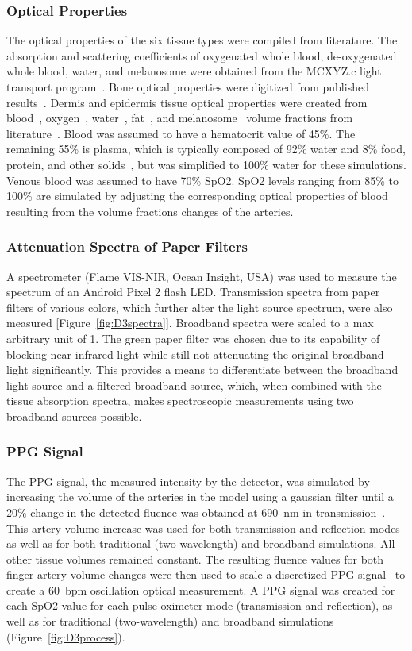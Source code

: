 \subsubsection{Optical Properties}
The optical properties of the six tissue types were compiled from literature. The absorption and scattering coefficients of oxygenated whole blood, de-oxygenated whole blood, water, and melanosome were obtained from the MCXYZ.c light transport program~\cite{JacquesMCXYZ}. Bone optical properties were digitized from published results~\cite{KonugoluVenkataSekar2016}. Dermis and epidermis tissue optical properties were created from blood~\cite{Prahl2012}, oxygen~\cite{Jacques2013}, water~\cite{Hale1973}, fat~\cite{VanVeen2004}, and melanosome~\cite{Jacques1991} volume fractions from literature~\cite{Jacques2013}. Blood was assumed to have a hematocrit value of 45\%. The remaining 55\% is plasma, which is typically composed of 92\% water and 8\% food, protein, and other solids~\cite{Jacques2013}, but was simplified to 100\% water for these simulations. Venous blood was assumed to have 70\% SpO2. SpO2 levels ranging from 85\% to 100\% are simulated by adjusting the corresponding optical properties of blood resulting from the volume fractions changes of the arteries. 
        
\subsubsection{Attenuation Spectra of Paper Filters}
A spectrometer (Flame VIS-NIR, Ocean Insight, USA) was used to measure the spectrum of an Android Pixel 2 flash LED. Transmission spectra from paper filters of various colors, which further alter the light source spectrum, were also measured [Figure~\ref{fig:D3spectra}]. Broadband spectra were scaled to a max arbitrary unit of 1. The green paper filter was chosen due to its capability of blocking near-infrared light while still not attenuating the original broadband light significantly. This provides a means to differentiate between the broadband light source and a filtered broadband source, which, when combined with the tissue absorption spectra, makes spectroscopic measurements using two broadband sources possible. 

\subsubsection{PPG Signal}
The PPG signal, the measured intensity by the detector, was simulated by increasing the volume of the arteries in the model using a gaussian filter until a 20\% change in the detected fluence was obtained at 690~nm in transmission~\cite{Hertzman1938}. This artery volume increase was used for both transmission and reflection modes as well as for both traditional (two-wavelength) and broadband simulations. All other tissue volumes remained constant. The resulting fluence values for both finger artery volume changes were then used to scale a discretized PPG signal~\cite{Elgendi2012} to create a 60~bpm oscillation optical measurement. A PPG signal was created for each SpO2 value for each pulse oximeter mode (transmission and reflection), as well as for traditional (two-wavelength) and broadband simulations (Figure~\ref{fig:D3process}). 
        
